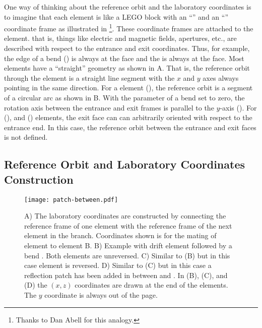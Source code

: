 One way of thinking about the reference orbit and the laboratory coordinates is to imagine that each
element is like a LEGO block with an ``'' and an ``'' coordinate frame as
illustrated in \footnote
  {
Thanks to Dan Abell for this analogy.
  }. 
These coordinate frames are attached to the element. that is, things like electric and magnetic
fields, apertures, etc., are described with respect to the entrance and exit coordinates.  Thus, for
example, the  edge of a bend () is always at the  face and the
 is always at the  face. Most elements have a ``straight'' geometry as shown in
A. That is, the reference orbit through the element is a straight line
segment with the $x$ and $y$ axes always pointing in the same direction.  For a  element
(), the reference orbit is a segment of a circular arc as shown in
B. With the  parameter of a bend set to zero, the rotation axis
between the entrance and exit frames is parallel to the $y$-axis (). For 
(), and  () elements, the exit face can can
arbitrarily oriented with respect to the entrance end. In this case, the reference orbit between the
entrance and exit faces is not defined.

\subsection{Reference Orbit and Laboratory Coordinates Construction}
\label{s:ref.construct}

\begin{figure}[tb]
  \centering
  \texttt{[image: patch-between.pdf]}
  \caption[Laboratory coordinates construction.]{A) The laboratory coordinates are constructed by
connecting the  reference frame of one element with the  reference frame
of the next element in the branch. Coordinates shown is for the mating of element  to element
{B}.  B) Example with drift element  followed by a bend . Both elements are
unreversed. C) Similar to (B) but in this case element  is reversed.  D) Similar to (C) but
in this case a reflection patch has been added in between  and .  In (B), (C), and
(D) the $(x,z)$ coordinates are drawn at the  end of the elements. The $y$ coordinate
is always out of the page.}
  \label{f:patch.between}
\end{figure}

